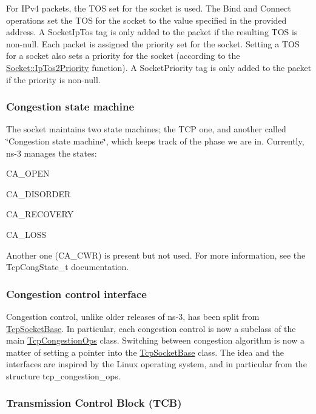 For I\+Pv4 packets, the T\+OS set for the socket is used. The Bind and Connect operations set the T\+OS for the socket to the value specified in the provided address. A Socket\+Ip\+Tos tag is only added to the packet if the resulting T\+OS is non-\/null. Each packet is assigned the priority set for the socket. Setting a T\+OS for a socket also sets a priority for the socket (according to the \hyperlink{classns3_1_1Socket_a81564620cc94d291f1dc5d79b2f13b4a}{Socket\+::\+Ip\+Tos2\+Priority} function). A Socket\+Priority tag is only added to the packet if the priority is non-\/null.

\subsubsection*{Congestion state machine }

The socket maintains two state machines; the T\+CP one, and another called \char`\"{}\+Congestion state machine\char`\"{}, which keeps track of the phase we are in. Currently, ns-\/3 manages the states\+:


\begin{DoxyItemize}
\item C\+A\+\_\+\+O\+P\+EN
\item C\+A\+\_\+\+D\+I\+S\+O\+R\+D\+ER
\item C\+A\+\_\+\+R\+E\+C\+O\+V\+E\+RY
\item C\+A\+\_\+\+L\+O\+SS
\end{DoxyItemize}

Another one (C\+A\+\_\+\+C\+WR) is present but not used. For more information, see the Tcp\+Cong\+State\+\_\+t documentation.

\subsubsection*{Congestion control interface }

Congestion control, unlike older releases of ns-\/3, has been split from \hyperlink{classns3_1_1TcpSocketBase}{Tcp\+Socket\+Base}. In particular, each congestion control is now a subclass of the main \hyperlink{classns3_1_1TcpCongestionOps}{Tcp\+Congestion\+Ops} class. Switching between congestion algorithm is now a matter of setting a pointer into the \hyperlink{classns3_1_1TcpSocketBase}{Tcp\+Socket\+Base} class. The idea and the interfaces are inspired by the Linux operating system, and in particular from the structure tcp\+\_\+congestion\+\_\+ops.

\subsubsection*{Transmission Control Block (T\+CB) }

